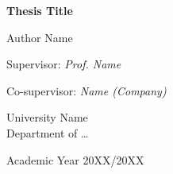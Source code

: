 \documentclass[12pt,a4paper,oneside]{report}
\begin{document}
\begin{titlepage}
  \centering
  \vspace*{2cm}
  {\LARGE \textbf{Thesis Title}\par}
  \vspace{1.5cm}
  {\large Author Name \par}
  \vspace{0.5cm}
  {\large Supervisor: \textit{Prof. Name} \par}
  {\large Co-supervisor: \textit{Name (Company)} \par}
  \vfill
  {\large University Name \\ Department of \dots \par}
  \vspace{1cm}
  {\large Academic Year 20XX/20XX \par}
\end{titlepage}

\cleardoublepage
\begin{abstract}

\end{abstract}

\cleardoublepage
\tableofcontents
\cleardoublepage








\printbibliography[heading=bibintoc,title={References}]
\end{document}
